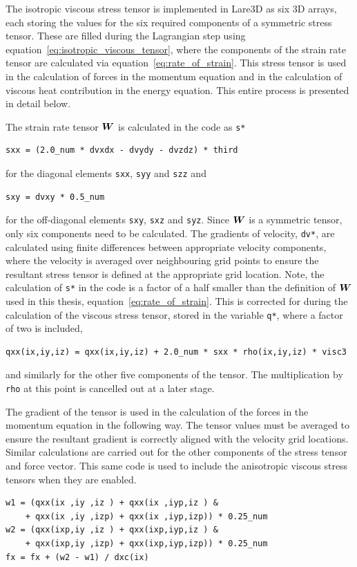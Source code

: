 The isotropic viscous stress tensor is implemented in Lare3D as six 3D arrays, each storing the values for the six required components of a symmetric stress tensor. These are filled during the Lagrangian step using equation~\ref{eq:isotropic_viscous_tensor}, where the components of the strain rate tensor are calculated via equation~\ref{eq:rate_of_strain}. This stress tensor is used in the calculation of forces in the momentum equation and in the calculation of viscous heat contribution in the energy equation. This entire process is presented in detail below.

The strain rate tensor ${\bm W}$ is calculated in the code as \verb|s*|
\begin{verbatim}
sxx = (2.0_num * dvxdx - dvydy - dvzdz) * third
\end{verbatim}
for the diagonal elements \verb|sxx|, \verb|syy| and \verb|szz| and
\begin{verbatim}
sxy = dvxy * 0.5_num
\end{verbatim}
for the off-diagonal elements \verb|sxy|, \verb|sxz| and \verb|syz|. Since ${\bm W}$ is a symmetric tensor, only six components need to be calculated. The gradients of velocity, \verb|dv*|, are calculated using finite differences between appropriate velocity components, where the velocity is averaged over neighbouring grid points to ensure the resultant stress tensor is defined at the appropriate grid location. Note, the calculation of \verb|s*| in the code is a factor of a half smaller than the definition of ${\bm W}$ used in this thesis, equation~\ref{eq:rate_of_strain}. This is corrected for during the calculation of the viscous stress tensor, stored in the variable \verb|q*|, where a factor of two is included,
\begin{verbatim}
qxx(ix,iy,iz) = qxx(ix,iy,iz) + 2.0_num * sxx * rho(ix,iy,iz) * visc3
\end{verbatim}
and similarly for the other five components of the tensor. The multiplication by \verb|rho| at this point is cancelled out at a later stage.

The gradient of the tensor is used in the calculation of the forces in the momentum equation in the following way. The tensor values must be averaged to ensure the resultant gradient is correctly aligned with the velocity grid locations. Similar calculations are carried out for the other components of the stress tensor and force vector. This same code is used to include the anisotropic viscous stress tensors when they are enabled.
\begin{verbatim}
w1 = (qxx(ix ,iy ,iz ) + qxx(ix ,iyp,iz ) &
    + qxx(ix ,iy ,izp) + qxx(ix ,iyp,izp)) * 0.25_num
w2 = (qxx(ixp,iy ,iz ) + qxx(ixp,iyp,iz ) &
    + qxx(ixp,iy ,izp) + qxx(ixp,iyp,izp)) * 0.25_num
fx = fx + (w2 - w1) / dxc(ix)
\end{verbatim}

